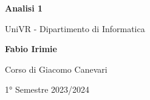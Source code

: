 \begin{titlepage}
	\begin{center}
		\vspace*{1cm}

		\Huge
		\textbf{Analisi 1}

		\vspace{0.5cm}
		\LARGE
		UniVR - Dipartimento di Informatica

		\vspace{1.5cm}

		\textbf{Fabio Irimie}

		\vfill


		\vspace{0.8cm}

    Corso di Giacomo Canevari

		1° Semestre 2023/2024

	\end{center}
\end{titlepage}
